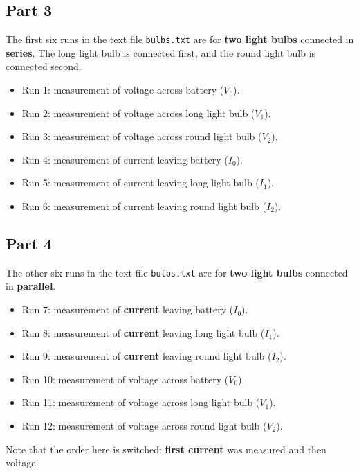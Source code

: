 \subsection{Part 3}
The first six runs in the text file \texttt{bulbs.txt} are for \textbf{two light bulbs} connected in \textbf{series}. The long light bulb is connected first, and the round light bulb is connected second.
\begin{itemize}
	\item Run 1: measurement of voltage across battery ($V_{0}$).
	\item Run 2: measurement of voltage across long light bulb ($V_{1}$).
	\item Run 3: measurement of voltage across round light bulb ($V_{2}$).
	\item Run 4: measurement of current leaving battery ($I_{0}$).
	\item Run 5: measurement of current leaving long light bulb ($I_{1}$).
	\item Run 6: measurement of current leaving round light bulb ($I_{2}$).
\end{itemize}
\subsection{Part 4}
The other six runs in the text file \texttt{bulbs.txt} are for \textbf{two light bulbs} connected in \textbf{parallel}.
\begin{itemize}
	\item Run 7: measurement of \textbf{current} leaving battery ($I_{0}$).
	\item Run 8: measurement of \textbf{current} leaving long light bulb ($I_{1}$).
	\item Run 9: measurement of \textbf{current} leaving round light bulb ($I_{2}$).
	\item Run 10: measurement of voltage across battery ($V_{0}$).
	\item Run 11: measurement of voltage across long light bulb ($V_{1}$).
	\item Run 12: measurement of voltage across round light bulb ($V_{2}$).
\end{itemize}
Note that the order here is switched: \textbf{first current} was measured and then voltage.
